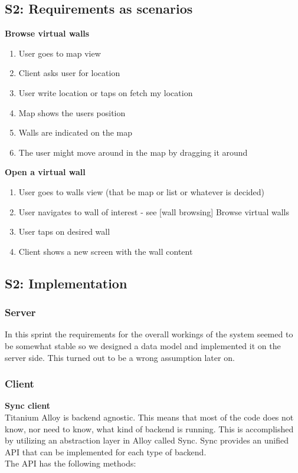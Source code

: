 \documentclass[11pt]{book}
\begin{document}
\subsection{S2: Requirements as scenarios}
\textbf{Browse virtual walls}
\begin{enumerate}
    \item User goes to map view
    \item Client asks user for location
    \item User write location or taps on fetch my location
    \item Map shows the users position
    \item Walls are indicated on the map
    \item The user might move around in the map by dragging it around
\end{enumerate}

\textbf{Open a virtual wall}
\begin{enumerate}
    \item User goes to walls view (that be map or list or whatever is decided)
    \item User navigates to wall of interest - see [wall browsing] Browse virtual walls
    \item User taps on desired wall
    \item Client shows a new screen with the wall content
\end{enumerate}

\subsection{S2: Implementation}

\subsubsection{Server}

In this sprint the requirements for the overall workings of the system seemed to be somewhat stable so we designed a data model and implemented it on the server side. This turned out to be a wrong assumption later on.

\subsubsection{Client}
\textbf{Sync client}\\
Titanium Alloy is backend agnostic. This means that most of the code does not know, nor need to know, what kind of backend is running. This is accomplished by utilizing an abstraction layer in Alloy called Sync. Sync provides an unified API that can be implemented for each type of backend.\\
The API has the following methods:
\end{document}
